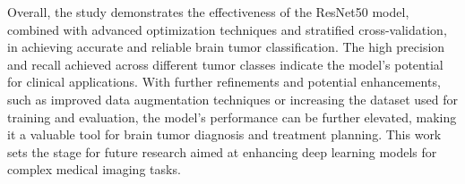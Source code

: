 Overall, the study demonstrates the effectiveness of the ResNet50 model, combined with advanced optimization techniques and stratified cross-validation, in achieving accurate and reliable brain tumor classification. The high precision and recall achieved across different tumor classes indicate the model's potential for clinical applications. With further refinements and potential enhancements, such as improved data augmentation techniques or increasing the dataset used for training and evaluation, the model's performance can be further elevated, making it a valuable tool for brain tumor diagnosis and treatment planning. This work sets the stage for future research aimed at enhancing deep learning models for complex medical imaging tasks.
